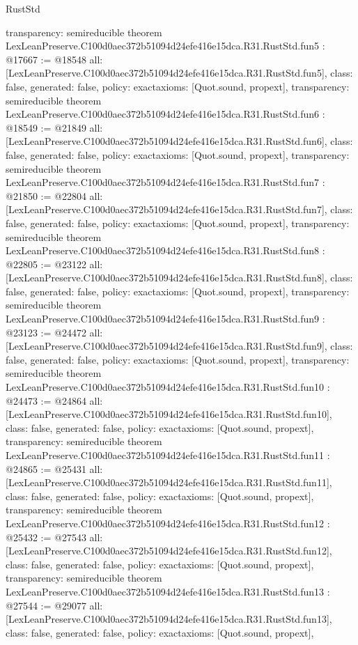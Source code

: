 \begin{lexlean}{RustStd}
\begin{coremodule}
{  transparency: semireducible
}
theorem LexLeanPreserve.C100d0aec372b51094d24efe416e15dca.R31.RustStd.fun5 : @17667 := @18548 {
  all: [LexLeanPreserve.C100d0aec372b51094d24efe416e15dca.R31.RustStd.fun5],
  class: false,
  generated: false,
  policy: exact{axioms: [Quot.sound, propext]},
  transparency: semireducible
}
theorem LexLeanPreserve.C100d0aec372b51094d24efe416e15dca.R31.RustStd.fun6 : @18549 := @21849 {
  all: [LexLeanPreserve.C100d0aec372b51094d24efe416e15dca.R31.RustStd.fun6],
  class: false,
  generated: false,
  policy: exact{axioms: [Quot.sound, propext]},
  transparency: semireducible
}
theorem LexLeanPreserve.C100d0aec372b51094d24efe416e15dca.R31.RustStd.fun7 : @21850 := @22804 {
  all: [LexLeanPreserve.C100d0aec372b51094d24efe416e15dca.R31.RustStd.fun7],
  class: false,
  generated: false,
  policy: exact{axioms: [Quot.sound, propext]},
  transparency: semireducible
}
theorem LexLeanPreserve.C100d0aec372b51094d24efe416e15dca.R31.RustStd.fun8 : @22805 := @23122 {
  all: [LexLeanPreserve.C100d0aec372b51094d24efe416e15dca.R31.RustStd.fun8],
  class: false,
  generated: false,
  policy: exact{axioms: [Quot.sound, propext]},
  transparency: semireducible
}
theorem LexLeanPreserve.C100d0aec372b51094d24efe416e15dca.R31.RustStd.fun9 : @23123 := @24472 {
  all: [LexLeanPreserve.C100d0aec372b51094d24efe416e15dca.R31.RustStd.fun9],
  class: false,
  generated: false,
  policy: exact{axioms: [Quot.sound, propext]},
  transparency: semireducible
}
theorem LexLeanPreserve.C100d0aec372b51094d24efe416e15dca.R31.RustStd.fun10 : @24473 := @24864 {
  all: [LexLeanPreserve.C100d0aec372b51094d24efe416e15dca.R31.RustStd.fun10],
  class: false,
  generated: false,
  policy: exact{axioms: [Quot.sound, propext]},
  transparency: semireducible
}
theorem LexLeanPreserve.C100d0aec372b51094d24efe416e15dca.R31.RustStd.fun11 : @24865 := @25431 {
  all: [LexLeanPreserve.C100d0aec372b51094d24efe416e15dca.R31.RustStd.fun11],
  class: false,
  generated: false,
  policy: exact{axioms: [Quot.sound, propext]},
  transparency: semireducible
}
theorem LexLeanPreserve.C100d0aec372b51094d24efe416e15dca.R31.RustStd.fun12 : @25432 := @27543 {
  all: [LexLeanPreserve.C100d0aec372b51094d24efe416e15dca.R31.RustStd.fun12],
  class: false,
  generated: false,
  policy: exact{axioms: [Quot.sound, propext]},
  transparency: semireducible
}
theorem LexLeanPreserve.C100d0aec372b51094d24efe416e15dca.R31.RustStd.fun13 : @27544 := @29077 {
  all: [LexLeanPreserve.C100d0aec372b51094d24efe416e15dca.R31.RustStd.fun13],
  class: false,
  generated: false,
  policy: exact{axioms: [Quot.sound, propext]},
}
\end{coremodule}
\end{lexlean}
